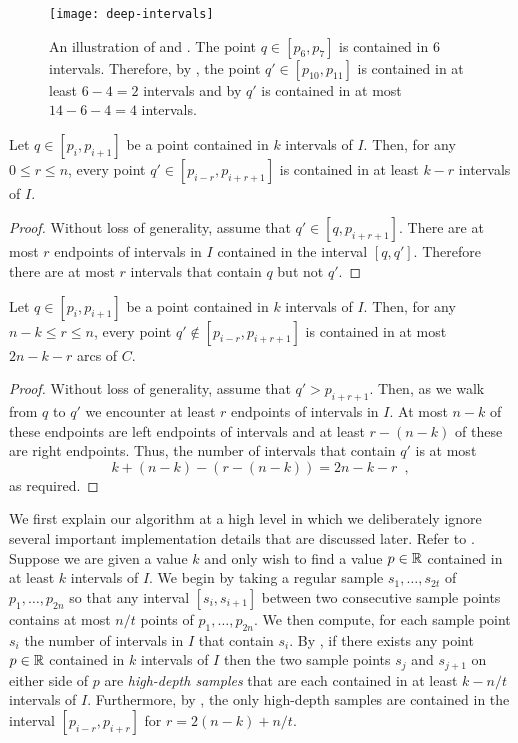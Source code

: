 \documentclass[charterfonts,lotsofwhite]{patmorin}
\begin{document}
\begin{figure}
\begin{center}
\texttt{[image: deep-intervals]}
\end{center}
\caption{An illustration of  and .  The point $q\in
[p_6,p_7]$ is contained in 6 intervals.  Therefore, by , the point $q'\in
[p_{10},p_{11}]$ is contained in at least $6-4 = 2$ intervals and by
 $q'$ is contained in at most $14-6-4=4$ intervals.}
\end{figure}

\begin{lem}
Let $q\in[p_i,p_{i+1}]$ be a point contained in $k$ intervals of $I$.
Then, for any $0\le r\le n$, every point $q'\in[p_{i-r},p_{i+r+1}]$ is
contained in at least $k-r$ intervals of $I$.
\end{lem}

\begin{proof}
Without loss of generality, assume that $q'\in[q,p_{i+r+1}]$.  There are
at most $r$ endpoints of intervals in $I$ contained in the interval
$[q,q']$.  Therefore there are at most $r$ intervals that contain $q$
but not $q'$.
\end{proof}

\begin{lem}
Let $q\in[p_i,p_{i+1}]$ be a point contained in $k$ intervals of $I$.
Then, for any $n-k \le r\le n$, every point $q'\notin[p_{i-r},p_{i+r+1}]$ 
is contained in at most $2n-k-r$ arcs of $C$.
\end{lem}

\begin{proof}
Without loss of generality, assume that $q'> p_{i+r+1}$.  Then, as we
walk from $q$ to $q'$ we encounter at least $r$ endpoints of intervals
in $I$.  At most $n-k$ of these endpoints are left endpoints of
intervals and at least $r-(n-k)$ of these are right endpoints.  Thus,
the number of intervals that contain $q'$ is at most
\[
      k + (n-k) - (r-(n-k)) = 2n - k - r \enspace ,
\]
as required.
\end{proof}

We first explain our algorithm at a high level in which we
deliberately ignore several important implementation details that are
discussed later.  Refer to . Suppose we are given
a value $k$ and only wish to find a value $p\in\mathbb{R}$ contained in at
least $k$ intervals of $I$.  We begin by taking a regular sample
$s_1,\ldots,s_{2t}$ of $p_1,\ldots,p_{2n}$ so that any interval
$[s_i,s_{i+1}]$ between two consecutive sample points contains at most
$n/t$ points of $p_1,\ldots,p_{2n}$.  We then compute, for each sample
point $s_i$ the number of intervals in $I$ that contain $s_i$.  By
, if there exists any point $p\in \mathbb{R}$ contained in $k$
intervals of $I$ then the two sample points $s_j$ and $s_{j+1}$ on
either side of $p$ are \emph{high-depth samples} that are each
contained in at least $k-n/t$ intervals of $I$.  Furthermore, by
, the only high-depth samples are contained in the
interval $[p_{i-r},p_{i+r}]$ for $r=2(n-k)+n/t$.  
\end{document}

